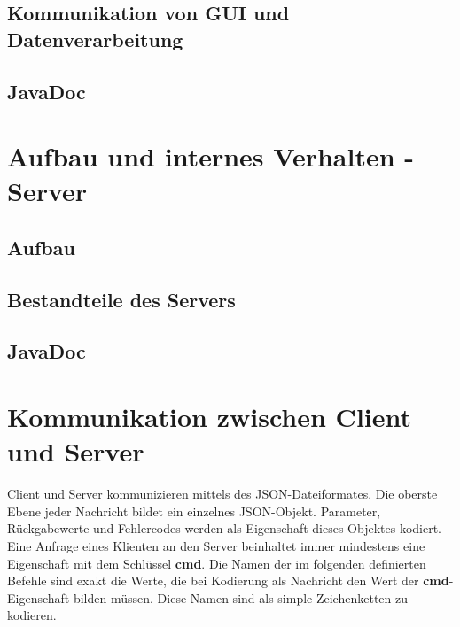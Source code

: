 \documentclass[parskip=full,11pt]{scrartcl}
\begin{document}
\subsection{Kommunikation von GUI und Datenverarbeitung}

\subsection{JavaDoc}

\pagebreak
\section{Aufbau und internes Verhalten - Server}

\subsection{Aufbau}

\subsection{Bestandteile des Servers}

\subsection{JavaDoc}

\pagebreak
\section{Kommunikation zwischen Client und Server}
Client und Server kommunizieren mittels des JSON-Dateiformates.
Die oberste Ebene jeder Nachricht bildet ein einzelnes JSON-Objekt.
Parameter, Rückgabewerte und Fehlercodes werden als Eigenschaft dieses Objektes
kodiert.
Eine Anfrage eines Klienten an den Server beinhaltet immer mindestens eine
Eigenschaft mit dem Schlüssel \textbf{cmd}.
Die Namen der im folgenden definierten Befehle sind exakt die Werte, die bei
Kodierung als Nachricht den Wert der \textbf{cmd}-Eigenschaft bilden müssen.
Diese Namen sind als simple Zeichenketten zu kodieren.
\end{document}

